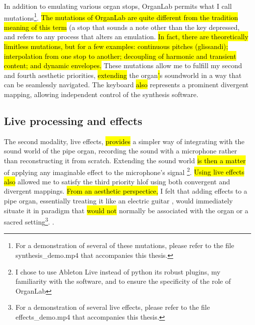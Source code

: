 \documentclass[12pt,twoside,maitrise]{dms_ks}
\theoremstyle{definition}
\begin{document}
{%

In addition to emulating various organ stops, OrganLab permits what I call mutations\footnote{For a demonstration of several of these mutations, please refer to the file synthesis\_demo.mp4 that accompanies this thesis.}. 
\hl{The mutations of OrganLab are quite different from the tradition meaning of this term} (a stop that sounds a note other than the key depressed, and refers to any process that alters an emulation.  
\hl{In fact, there are theoretically limitless mutations, but for a few examples: continuous pitches (glissandi); interpolation from one stop to another; decoupling of harmonic and transient content; and dynamic envelopes.} 
These mutations allow me to fulfill my second and fourth aesthetic priorities, \hl{extending} the organ\hl{'}s soundworld in a way that can be seamlessly navigated. 
The keyboard \hl{also} represents a prominent divergent mapping, allowing independent control of the synthesis software.  


\subsection{Live processing and effects}

The second modality, live effects, \hl{provides} a simpler way of integrating with the sound world of the pipe organ, recording the sound with a microphone rather than reconstructing it from scratch. 
Extending the sound world \hl{is then a matter} of applying any imaginable effect to the microphone's signal \footnote{I chose to use Ableton Live instead of python its robust plugins, my familiarity with the software, and to ensure the specificity of the role of OrganLab}. 
\hl{Using live effects also} allowed me to satisfy the third priority hl{of using} both convergent and divergent mappings. 
\hl{From an aesthetic perspectice,} I felt that adding effects to a pipe organ, essentially treating it  like an electric guitar , would immediately situate it in  paradigm that \hl{would not} normally be associated with the organ or a sacred setting\footnote{For a demonstration of several live effects, please refer to the file effects\_demo.mp4 that accompanies this thesis.}. . 

}
\end{document}
